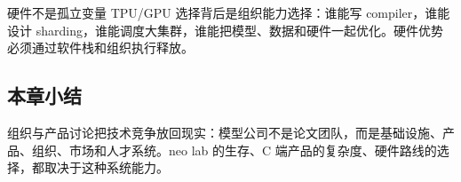 \begin{importantbox}{硬件不是孤立变量}
TPU/GPU 选择背后是组织能力选择：谁能写 compiler，谁能设计 sharding，谁能调度大集群，谁能把模型、数据和硬件一起优化。硬件优势必须通过软件栈和组织执行释放。
\end{importantbox}

\subsection{本章小结}

组织与产品讨论把技术竞争放回现实：模型公司不是论文团队，而是基础设施、产品、组织、市场和人才系统。neo lab 的生存、C 端产品的复杂度、硬件路线的选择，都取决于这种系统能力。

